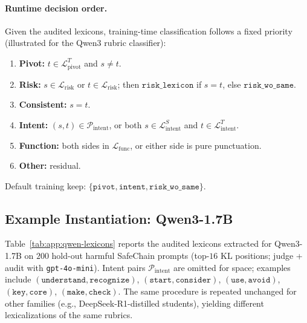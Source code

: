 \paragraph{Runtime decision order.}
Given the audited lexicons, training-time classification follows a fixed
priority (illustrated for the Qwen3 rubric classifier):
\begin{enumerate}[leftmargin=*, topsep=2pt, itemsep=1pt]
  \item \textbf{Pivot:} $t\in\mathcal{L}_{\mathrm{pivot}}^{T}$ and $s\neq t$.
  \item \textbf{Risk:} $s\in\mathcal{L}_{\mathrm{risk}}$ or
        $t\in\mathcal{L}_{\mathrm{risk}}$; then
        $\texttt{risk\_lexicon}$ if $s\!=\!t$, else $\texttt{risk\_wo\_same}$.
  \item \textbf{Consistent:} $s\!=\!t$.
  \item \textbf{Intent:} $(s,t)\in\mathcal{P}_{\mathrm{intent}}$, or
        both $s\in\mathcal{L}_{\mathrm{intent}}^{S}$ and
        $t\in\mathcal{L}_{\mathrm{intent}}^{T}$.
  \item \textbf{Function:} both sides in $\mathcal{L}_{\mathrm{func}}$, or
        either side is pure punctuation.
  \item \textbf{Other:} residual.
\end{enumerate}
Default training keep:
$\{\texttt{pivot},\texttt{intent},\texttt{risk\_wo\_same}\}$.

\subsection{Example Instantiation: Qwen3-1.7B}
\label{app:classifier:qwen}

Table~\ref{tab:app:qwen-lexicons} reports the audited lexicons extracted for
Qwen3-1.7B on $200$ hold-out harmful SafeChain prompts (top-$16$ KL positions;
judge + audit with \texttt{gpt-4o-mini}).
Intent pairs $\mathcal{P}_{\mathrm{intent}}$ are omitted for space; examples
include
$(\texttt{understand},\texttt{recognize})$,
$(\texttt{start},\texttt{consider})$,
$(\texttt{use},\texttt{avoid})$,
$(\texttt{key},\texttt{core})$,
$(\texttt{make},\texttt{check})$.
The same procedure is repeated unchanged for other families
(e.g., DeepSeek-R1-distilled students), yielding different lexicalizations of
the same rubrics.


